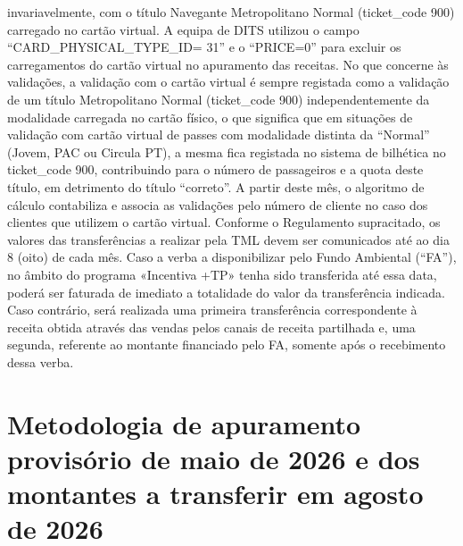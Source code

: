 \documentclass[
  a4paper,
]{article}
\begin{document}
invariavelmente, com o título Navegante Metropolitano Normal
(ticket\_code 900) carregado no cartão virtual. A equipa de DITS
utilizou o campo ``CARD\_PHYSICAL\_TYPE\_ID= 31'' e o ``PRICE=0'' para
excluir os carregamentos do cartão virtual no apuramento das receitas.
No que concerne às validações, a validação com o cartão virtual é sempre
registada como a validação de um título Metropolitano Normal
(ticket\_code 900) independentemente da modalidade carregada no cartão
físico, o que significa que em situações de validação com cartão virtual
de passes com modalidade distinta da ``Normal'' (Jovem, PAC ou Circula
PT), a mesma fica registada no sistema de bilhética no ticket\_code 900,
contribuindo para o número de passageiros e a quota deste título, em
detrimento do título ``correto''. A partir deste mês, o algoritmo de
cálculo contabiliza e associa as validações pelo número de cliente no
caso dos clientes que utilizem o cartão virtual. Conforme o Regulamento
supracitado, os valores das transferências a realizar pela TML devem ser
comunicados até ao dia 8 (oito) de cada mês. Caso a verba a
disponibilizar pelo Fundo Ambiental (``FA''), no âmbito do programa
«Incentiva +TP» tenha sido transferida até essa data, poderá ser
faturada de imediato a totalidade do valor da transferência indicada.
Caso contrário, será realizada uma primeira transferência correspondente
à receita obtida através das vendas pelos canais de receita partilhada
e, uma segunda, referente ao montante financiado pelo FA, somente após o
recebimento dessa verba.

\section{Metodologia de apuramento provisório de maio de 2026 e dos
montantes a transferir em agosto de
2026}\label{metodologia-de-apuramento-provisuxf3rio-de-maio-de-2026-e-dos-montantes-a-transferir-em-agosto-de-2026}
\end{document}
